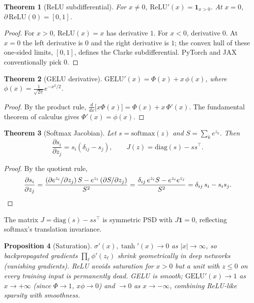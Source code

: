 \documentclass[11pt]{article}
\newtheorem{theorem}{Theorem}[section]
\newtheorem{proposition}[theorem]{Proposition}
\theoremstyle{remark}
\begin{document}
\begin{theorem}[ReLU subdifferential]
For $x\neq 0$, $\mathrm{ReLU}'(x) = \mathbf{1}_{x>0}$. At $x=0$, $\partial\,\mathrm{ReLU}(0) = [0,1]$.
\end{theorem}
\begin{proof}
For $x>0$, $\mathrm{ReLU}(x)=x$ has derivative $1$. For $x<0$, derivative $0$. At $x=0$ the left derivative is $0$ and the right derivative is $1$; the convex hull of these one-sided limits, $[0,1]$, defines the Clarke subdifferential. PyTorch and JAX conventionally pick $0$.
\end{proof}

\begin{theorem}[GELU derivative]
$\mathrm{GELU}'(x) = \Phi(x) + x\,\phi(x)$, where $\phi(x) = \tfrac{1}{\sqrt{2\pi}}e^{-x^2/2}$.
\end{theorem}
\begin{proof}
By the product rule, $\frac{d}{dx}\bigl[x\Phi(x)\bigr] = \Phi(x) + x\,\Phi'(x)$. The fundamental theorem of calculus gives $\Phi'(x) = \phi(x)$.
\end{proof}

\begin{theorem}[Softmax Jacobian]\label{thm:smj}
Let $s = \mathrm{softmax}(z)$ and $S = \sum_k e^{z_k}$. Then
\[
\frac{\partial s_i}{\partial z_j} = s_i(\delta_{ij} - s_j), \qquad J(z) = \mathrm{diag}(s) - s s^\top.
\]
\end{theorem}
\begin{proof}
By the quotient rule,
\[
\frac{\partial s_i}{\partial z_j} = \frac{(\partial e^{z_i}/\partial z_j)\,S - e^{z_i}\,(\partial S/\partial z_j)}{S^2} = \frac{\delta_{ij}\,e^{z_i} S - e^{z_i} e^{z_j}}{S^2} = \delta_{ij}\,s_i - s_i s_j. \qedhere
\]
\end{proof}

The matrix $J = \mathrm{diag}(s) - ss^\top$ is symmetric PSD with $J\mathbf{1} = 0$, reflecting softmax's translation invariance.

\begin{proposition}[Saturation]
$\sigma'(x), \tanh'(x) \to 0$ as $|x|\to\infty$, so backpropagated gradients $\prod_\ell \phi'(z_\ell)$ shrink geometrically in deep networks (vanishing gradients). ReLU avoids saturation for $x>0$ but a unit with $z\le 0$ on every training input is permanently dead. GELU is smooth; $\mathrm{GELU}'(x)\to 1$ as $x\to+\infty$ (since $\Phi\to 1$, $x\phi\to 0$) and $\to 0$ as $x\to-\infty$, combining ReLU-like sparsity with smoothness.
\end{proposition}
\end{document}
